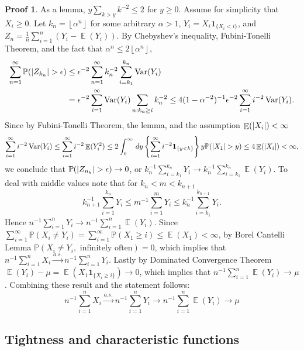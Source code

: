 \documentclass[hidelinks,11pt]{article}
\theoremstyle{definition}
\theoremstyle{dotless}
\newtheorem{prop}{Proof}[section]
\theoremstyle{remark}
\DeclareMathOperator{\Var}{Var}
\DeclareMathOperator{\E}{\mathbb{E}}
\DeclareMathOperator{\1}{\mathbf{1}}
\DeclareMathOperator{\0}{\mathbf{0}}
\begin{document}
\begin{prop}
As a lemma, $y\sum_{k>y}k^{-2}\leq2$ for $y\geq0$.\medbreak
Assume for simplicity that $X_i\geq0$. Let $k_n=\left\lfloor{\alpha^n}\right\rfloor$ for some arbitrary $\alpha>1$, $Y_i=X_i\textbf{1}_{\{X_i<i\}}$, and $Z_n=\frac{1}{n}\sum_{i=1}^n(Y_i-\E(Y_i))$.\medbreak
By Chebyshev's inequality,  Fubini-Tonelli Theorem, and the fact that $\alpha^n\leq2\left\lfloor{\alpha^n}\right\rfloor$,
\begin{align*}
\sum_{n=1}^\infty\mathbb{P}(\abs{Z_{k_n}}>\epsilon)&\leq\epsilon^{-2}\sum_{n=1}^\infty k_n^{-2}\sum_{i=k_1}^{k_n}\Var(Y_i)\\
&=\epsilon^{-2}\sum_{i=1}^\infty\Var(Y_i)\sum_{n:k_n\geq i}k_n^{-2}\leq4(1-\alpha^{-2})^{-1}\epsilon^{-2}\sum_{i=1}^\infty i^{-2}\Var(Y_i).
\end{align*}
Since by Fubini-Tonelli Theorem, the lemma, and the assumption $\E(\abs{X_i})<\infty$
\[\sum_{i=1}^\infty i^{-2}\Var(Y_i)\leq\sum_{i=1}^\infty i^{-2}\E(Y_i^2)\leq2\int_0^\infty\,dy\left\{\sum_{i=1}^\infty i^{-2}\textbf{1}_{\{y<k\}}\right\}y\mathbb{P}(\abs{X_1}>y)\leq4\E(\abs{X_i})<\infty,\]
we conclude that $\mathbb{P}(\abs{Z_{n_k}}>\epsilon)\to0$, or $k_n^{-1}\sum_{i=k_1}^{k_n}Y_i\to k_n^{-1}\sum_{i=k_1}^{k_n}\E(Y_i)$. To deal with middle values note that for $k_n<m<k_{n+1}$
\[k_{n+1}^{-1}\sum_{i=1}^{k_n}Y_i\leq m^{-1}\sum_{i=1}^mY_i\leq k_n^{-1}\sum_{i=k_1}^{k_{n+1}}Y_i.\]
Hence $n^{-1}\sum_{i=1}^nY_i\to n^{-1}\sum_{i=1}^n\E(Y_i)$.\medbreak
Since $\sum_{i=1}^\infty\mathbb{P}(X_i\neq Y_i)=\sum_{i=1}^\infty\mathbb{P}(X_1\geq i)\leq\E(X_1)<\infty$, by Borel Cantelli Lemma $\mathbb{P}(X_i\neq Y_i,\textrm{ infinitely often})=0$, which implies that $n^{-1}\sum_{i=1}^nX_i\xrightarrow{a.s.}n^{-1}\sum_{i=1}^nY_i$.\medbreak
Lastly by Dominated Convergence Theorem $\E(Y_i)-\mu=\E(X_1\textbf{1}_{\{X_i\geq i\}})\to0$, which implies that $n^{-1}\sum_{i=1}^n\E(Y_i)\to\mu$. Combining these result and the statement follows:
\[n^{-1}\sum_{i=1}^nX_i\xrightarrow{a.s.}n^{-1}\sum_{i=1}^nY_i\to n^{-1}\sum_{i=1}^n\E(Y_i)\to\mu\]
\end{prop}

\subsection{Tightness and characteristic functions}
\end{document}
